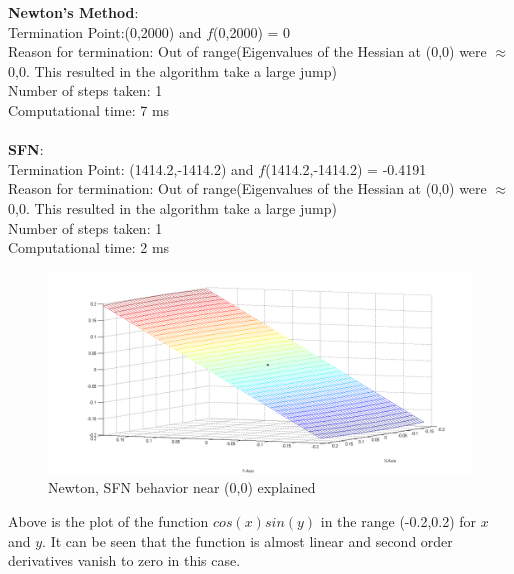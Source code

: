 \textbf{Newton’s Method}: 
\\Termination Point:(0,2000) and $f$(0,2000) = 0
\\Reason for termination: Out of range(Eigenvalues of the Hessian at (0,0) were $\approx$ 0,0. This resulted in the algorithm take a large jump)
\\Number of steps taken: 1
\\Computational time: 7 ms
\\\\
\textbf{SFN}: 
\\Termination Point: (1414.2,-1414.2) and $f$(1414.2,-1414.2) = -0.4191
\\Reason for termination: Out of range(Eigenvalues of the Hessian at (0,0) were $\approx$ 0,0. This resulted in the algorithm take a large jump)
\\Number of steps taken: 1
\\Computational time: 2 ms

\begin{figure}[H]
\includegraphics[scale = 0.45]{54.png}
\caption{Newton, SFN behavior near (0,0) explained}
\end{figure}

Above is the plot of the function $cos(x)sin(y)$ in the range (-0.2,0.2) for $x$ and $y$. It can be seen that the function is almost linear and second order derivatives vanish to zero in this case.


\newpage

